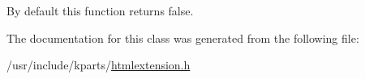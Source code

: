 By default this function returns false. 

The documentation for this class was generated from the following file\+:\begin{DoxyCompactItemize}
\item 
/usr/include/kparts/\hyperlink{htmlextension_8h}{htmlextension.\+h}\end{DoxyCompactItemize}
